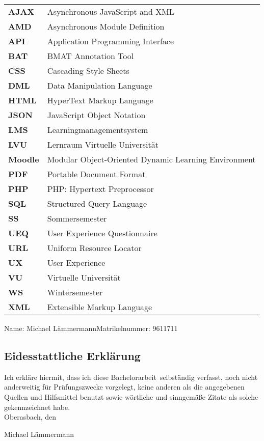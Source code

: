 \documentclass[twoside,bibliography=totoc,openany,numbers=noenddot]{fumi}
\newcommand{\thesisauthor}{Michael Lämmermann}
\newcommand{\thesistype}{Bachelorarbeit} %
\newcommand{\thesismatrikelnummer}{9611711}
\begin{document}
\renewcommand*{\arraystretch}{1.4}
\setlength{\LTleft}{0pt}
\begin{longtable}[l]{p{2cm}p{15cm}}
\textbf{AJAX} & Asynchronous JavaScript and XML \\
\textbf{AMD} & Asynchronous Module Definition \\
\textbf{API} & Application Programming Interface \\
\textbf{BAT} & BMAT Annotation Tool \\
\textbf{CSS} & Cascading Style Sheets \\
\textbf{DML} & Data Manipulation Language \\
\textbf{HTML} & HyperText Markup Language \\
\textbf{JSON} & JavaScript Object Notation \\
\textbf{LMS} & Learningmanagementsystem \\
\textbf{LVU} & Lernraum Virtuelle Universität \\
\textbf{Moodle} & Modular Object-Oriented Dynamic Learning Environment \\
\textbf{PDF} & Portable Document Format \\
\textbf{PHP} & PHP: Hypertext Preprocessor \\
\textbf{SQL} & Structured Query Language \\
\textbf{SS} & Sommersemester \\
\textbf{UEQ} & User Experience Questionnaire \\
\textbf{URL} & Uniform Resource Locator \\
\textbf{UX} & User Experience \\
\textbf{VU} & Virtuelle Universität \\
\textbf{WS} & Wintersemester \\
\textbf{XML} & Extensible Markup Language \\
\end{longtable}
\cleardoublepage


Name: \thesisauthor \hfill Matrikelnummer: \thesismatrikelnummer \vspace{2cm}
\subsection*{Eidesstattliche Erklärung}
Ich erkläre hiermit, dass ich diese \thesistype~selbständig verfasst, noch nicht anderweitig für Prüfungszwecke vorgelegt, keine anderen als die angegebenen Quellen und Hilfsmittel benutzt sowie wörtliche und sinngemäße Zitate als solche gekennzeichnet habe.\\[1cm]
Oberasbach, den \dotfill

\hspace{3,5cm}{\footnotesize Datum}\hspace{5cm} {\footnotesize \thesisauthor}
\end{document}
